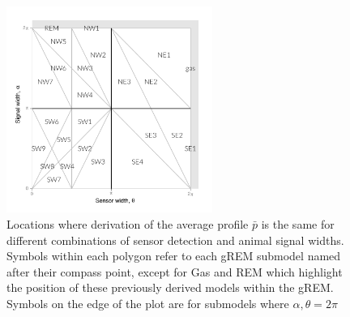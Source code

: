 \begin{knitrout}\footnotesize
{}\color{fgcolor}\begin{figure}[t]

{\centering \includegraphics[width=0.6\textwidth]{figure/equalRegions-1} 

}

\caption[Locations where derivation of the average profile $\bar{p}$ is the same]{
Locations where derivation of the average profile $\bar{p}$ is the same for different combinations of sensor detection and animal signal widths.
Symbols within each polygon refer to each gREM submodel named after their compass point, except for Gas and REM which highlight the position of these previously derived models within the gREM.
Symbols on the edge of the plot are for submodels where $\alpha, \theta = 2\pi$
}\label{fig:equalRegions}
\end{figure}


\end{knitrout}


